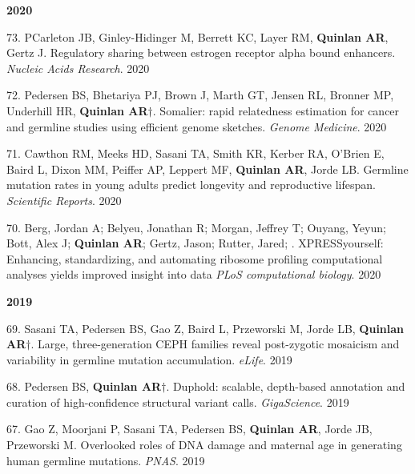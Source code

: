\documentclass[margin,line]{cv}
\begin{document}
\begin{resume}
    \textbf{2020} \\

    \begin{list}{*}{}

    \item[73.] PCarleton JB, Ginley-Hidinger M, Berrett KC, Layer RM, \textbf{Quinlan AR}, Gertz J. Regulatory sharing between estrogen receptor alpha bound enhancers. \emph{Nucleic Acids Research}. 2020

    \item[72.] Pedersen BS, Bhetariya PJ, Brown J, Marth GT, Jensen RL, Bronner MP, Underhill HR, \textbf{Quinlan AR}$\dagger$. Somalier: rapid relatedness estimation for cancer and germline studies using efficient genome sketches. \emph{Genome Medicine}. 2020

    \item[71.] Cawthon RM, Meeks HD, Sasani TA, Smith KR, Kerber RA, O'Brien E, Baird L, Dixon MM, Peiffer AP, Leppert MF, \textbf{Quinlan AR}, Jorde LB. Germline mutation rates in young adults predict longevity and reproductive lifespan. \emph{Scientific Reports}. 2020

    \item[70.] Berg, Jordan A; Belyeu, Jonathan R; Morgan, Jeffrey T; Ouyang, Yeyun; Bott, Alex J; \textbf{Quinlan AR}; Gertz, Jason; Rutter, Jared; . XPRESSyourself: Enhancing, standardizing, and automating ribosome profiling computational analyses yields improved insight into data \emph{PLoS computational biology}. 2020

    \end{list}  

    \textbf{2019} \\

    \begin{list}{*}{}

    \item[69.] Sasani TA, Pedersen BS, Gao Z, Baird L,  Przeworski M, Jorde LB, \textbf{Quinlan AR}$\dagger$. Large, three-generation CEPH families reveal post-zygotic mosaicism and variability in germline mutation accumulation. \emph{eLife}. 2019

    \item[68.] Pedersen BS, \textbf{Quinlan AR}$\dagger$. Duphold: scalable, depth-based annotation and curation of high-confidence structural variant calls. \emph{GigaScience}. 2019

    \item[67.] Gao Z, Moorjani P, Sasani TA, Pedersen BS, \textbf{Quinlan AR}, Jorde JB, Przeworski M. Overlooked roles of DNA damage and maternal age in generating human germline mutations. \emph{PNAS}. 2019


\end{list}
\end{resume}
\end{document}
